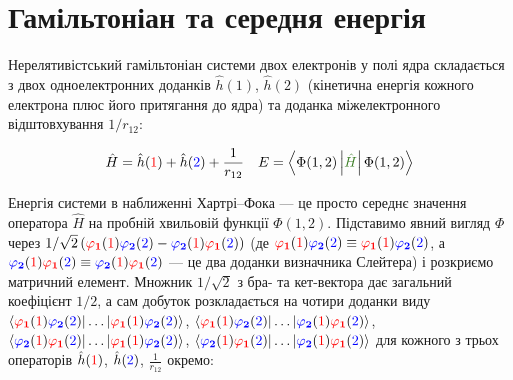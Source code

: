 \documentclass[]{article}
\def\opbracket#1#2#3{\left\langle #1\left| \textcolor{OliveGreen}{#2}\right|  #3 \right\rangle}
\let\vphi\varphi
\def\f{(\textcolor{red}{1})}
\def\s{(\textcolor{blue}{2})}
\def\oa{\textcolor{red}{ \vphi_{\mathbf{1}}} }
\def\ob{\textcolor{blue}{ \vphi_{\mathbf{2}}} }
\def\h{\hat{h}}
\def\ha{\h\f}
\def\hb{\h\s}
\def\V{\frac{1}{r_{12}}}
\def\a{\oa\f \ob\s}
\def\b{\ob\f \oa\s}
\begin{document}
\section{Гамільтоніан та середня енергія}

Нерелятивістський гамільтоніан системи двох електронів у полі ядра складається з двох одноелектронних доданків $\h(1)$, $\h(2)$ (кінетична енергія кожного електрона плюс його притягання до ядра) та доданка міжелектронного відштовхування $1/r_{12}$:

\begin{equation*}
    \hat{H} = \ha + \hb + \V \quad E = \opbracket{\Phi(1, 2)}{\hat{H}}{\Phi(1, 2)}
\end{equation*}

Енергія системи в наближенні Хартрі--Фока --- це просто середнє значення оператора $\hat H$ на пробній хвильовій функції $\Phi(1,2)$. Підставимо явний вигляд $\Phi$ через $1/\sqrt2\,(\a-\b)$ (де $\a\equiv\oa\f\ob\s$, а $\b\equiv\ob\f\oa\s$ --- це два доданки визначника Слейтера) і розкриємо матричний елемент. Множник $1/\sqrt2$ з бра- та кет-вектора дає загальний коефіцієнт $1/2$, а сам добуток розкладається на чотири доданки виду $\langle \a|\dots|\a\rangle$, $\langle\a|\dots|\b\rangle$, $\langle\b|\dots|\a\rangle$, $\langle\b|\dots|\b\rangle$ для кожного з трьох операторів $\ha$, $\hb$, $\V$ окремо:
\end{document}
